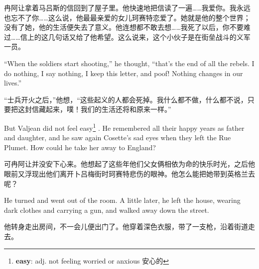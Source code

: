 \documentclass[fontset=ubuntu, zihao=5]{ctexart}
\begin{document}
\begin{paracol}{2}
\switchcolumn

冉阿让拿着马吕斯的信回到了屋子里。他快速地把信读了一遍……我爱你。我永远也忘不了你……这么说，他最最亲爱的女儿珂赛特恋爱了。她就是他的整个世界；没有了她，他的生活便失去了意义。他连想都不敢去想……我死了以后，你不要难过……信上的这几句话又给了他希望。这么说来，这个小伙子是在街垒战斗的义军一员。

\switchcolumn*

``When the soldiers start shooting,'' he thought, ``that's the end of all the rebels. I do nothing, I say nothing, I keep this letter, and poof! Nothing changes in our lives.''

\switchcolumn

“士兵开火之后，”他想，“这些起义的人都会死掉。我什么都不做，什么都不说，只要把这封信藏起来，噗！我们的生活还将和原来一样。”

\switchcolumn*

But Valjean did not feel easy\footnote{\textbf{easy}: adj. not feeling
  worried or anxious 安心的} . He remembered all their happy years as father
and daughter, and he saw again Cosette's sad eyes when they left the Rue
Plumet. How could he take her away to England?


\switchcolumn

可冉阿让并没安下心来。他想起了这些年他们父女俩相依为命的快乐时光，之后他眼前又浮现出他们离开卜吕梅街时珂赛特悲伤的眼神。他怎么能把她带到英格兰去呢？

\switchcolumn*

He turned and went out of the room. A little later, he left the house, wearing dark clothes and carrying a gun, and walked away down the street.

\switchcolumn

他转身走出房间，不一会儿便出门了。他穿着深色衣服，带了一支枪，沿着街道走去。

\end{paracol}
\clearpage
\end{document}
